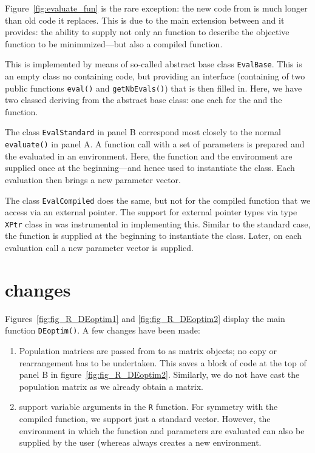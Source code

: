 \documentclass[nojss,shortnames,article]{jss}
\begin{document}
Figure~\ref{fig:evaluate_fun} is the rare exception: the new code from
 is much longer than old code it replaces.  This is due to the
main extension between  and  it provides: the
ability to supply not only an  function to describe the objective
function to be minimmized---but also a compiled function.

This is implemented by means of so-called abstract base class
\texttt{EvalBase}. This is an empty class no containing code, but providing
an interface (containing of two public functions \texttt{eval()} and
\texttt{getNbEvals()}) that is then filled in.  
Here, we have two classed deriving from the abstract base class: one each for
the  and the  function.  

The class \texttt{EvalStandard} in panel B correspond most closely to the
normal \texttt{evaluate()} in panel A. A function call with a set of
parameters is prepared and the evaluated in an environment. Here, the
function and the environment are supplied once at the beginning---and hence
used to instantiate the class.  Each evaluation then brings a new parameter
vector. 

The class \texttt{EvalCompiled} does the same, but not for the compiled
function that we access via an external pointer. The support for external
pointer types via type \texttt{XPtr} class in  was instrumental in
implementing this.  Similar to the standard case, the function is supplied at
the beginning to instantiate the class.  Later, on each evaluation call a new
parameter vector is supplied.

\section[R changes]{ changes}
\label{sec:Rchanges}

Figures~\ref{fig:fig_R_DEoptim1} and \ref{fig:fig_R_DEoptim2}
display the main  function \texttt{DEoptim()}.
A few changes have been made:
\begin{enumerate}
\item Population matrices are passed from  to  as
  matrix objects; no copy or rearrangement has to be undertaken.  This saves
  a block of code at the top of panel B in figure~\ref{fig:fig_R_DEoptim2}.
  Similarly, we do not have cast the population matrix as we already obtain a
  matrix. 
\item {} support variable arguments in the \texttt{R} function.
  For symmetry with the compiled function, we support just a standard
  vector.  However, the environment in which the function and parameters are
  evaluated can also be supplied by the user (whereas  always
  creates a new environment.
\end{enumerate}
\end{document}
